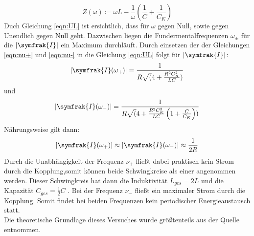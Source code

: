 \begin{equation*}
Z(\omega) \coloneq  \omega L - \frac{1}{\omega}\left(\frac{1}{C} + \frac{1}{C_K} \right)
\end{equation*}
Duch Gleichung \eqref{eqn:UL} ist ersichtlich, dass für $\omega$ gegen Null, sowie gegen Unendlich gegen Null geht. Dazwischen liegen die Fundermentalfrequenzen $\omega_{\pm}$ für
die $\lvert \symfrak{I} \rvert $ ein Maximum durchläuft. Durch einsetzen der der Gleichungen \eqref{eqn:nu+} und \eqref{eqn:nu-} in die Gleichung \eqref{eqn:UL} folgt für
$\lvert \symfrak{I} \rvert $:
\begin{equation}
  \lvert \symfrak{I}(\omega_+) \rvert = \frac{1}{R \sqrt(4 + \frac{R^2 C_{K}^2}{LC})}
  \label{eqn:Io+}
\end{equation}
und
\begin{equation}
  \lvert \symfrak{I}(\omega_-) \rvert = \frac{1}{R \sqrt(4 + \frac{R^2 C_{K}^2}{LC}\left(1+ \frac {C}{C_K}\right))}
  \label{eqn:Io-}
\end{equation}
Nährungsweise gilt dann:
\begin{equation*}
  \lvert \symfrak{I}(\omega_+) \rvert \approx \lvert \symfrak{I}(\omega_-) \rvert \approx \frac{1}{2R}
\end{equation*}
Durch die Unabhängigkeit der Frequenz $ \nu_+ $ fließt dabei praktisch kein Strom durch die Kopplung,somit können beide Schwingkreise als einer angenommen werden.
Dieser Schwingkreis hat dann die Induktivität $L_{ges} = 2L $ und die Kapazität $ C_{ges} = \frac{1}{2} C $ . Bei der Frequenz $\nu_-$ fließt ein maximaler Strom
durch die Kopplung. Somit findet bei beiden Frequenzen kein periodischer Energieaustausch statt. \\
Die theoretische Grundlage dieses Versuches wurde größtenteils aus der Quelle \cite{sample} entnommen.
